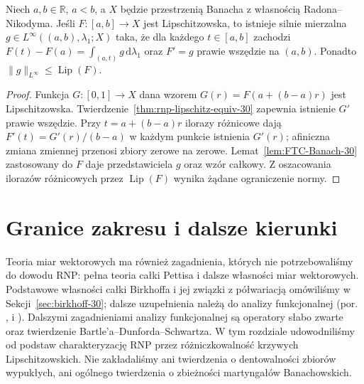 \begin{wniosek}\label{idx:30:wniosek:15}

Niech $a,b\in\mathbb R$, $a<b$, a $X$ będzie
przestrzenią Banacha z własnością Radona--Nikodyma.
Jeśli $F:[a,b]\to X$ jest Lipschitzowska, to istnieje
silnie mierzalna $g\in L^\infty((a,b),\lambda_1;X)$
taka, że dla każdego $t\in[a,b]$ zachodzi
$F(t)-F(a)=\int_{(a,t)}g\,\mathrm d\lambda_1$
oraz $F'=g$ prawie wszędzie na $(a,b)$.
Ponadto $\|g\|_{L^\infty}\le\operatorname{Lip}(F)$.
\end{wniosek}
\begin{proof}
Funkcja $G:[0,1]\to X$ dana wzorem
$G(r)=F(a+(b-a)r)$ jest Lipschitzowska.
Twierdzenie~\ref{thm:rnp-lipschitz-equiv-30} zapewnia
istnienie $G'$ prawie wszędzie. Przy $t=a+(b-a)r$
ilorazy różnicowe dają $F'(t)=G'(r)/(b-a)$
w każdym punkcie istnienia $G'(r)$; afiniczna
zmiana zmiennej przenosi zbiory zerowe na zerowe.
Lemat~\ref{lem:FTC-Banach-30} zastosowany do $F$
daje przedstawiciela $g$ oraz wzór całkowy.
Z oszacowania ilorazów różnicowych przez
$\operatorname{Lip}(F)$ wynika żądane ograniczenie normy.
\end{proof}

\section{Granice zakresu i dalsze kierunki}
Teoria miar wektorowych ma również zagadnienia,
których nie potrzebowaliśmy do dowodu RNP:
pełna teoria całki Pettisa i dalsze własności
miar wektorowych. Podstawowe własności całki Birkhoffa
i jej związki z półwariacją omówiliśmy w
Sekcji~\ref{sec:birkhoff-30}; dalsze uzupełnienia
należą do analizy funkcjonalnej
(por. ,
i ).
Dalszymi zagadnieniami analizy funkcjonalnej są operatory
słabo zwarte oraz twierdzenie Bartle'a--Dunforda--Schwartza.
W tym rozdziale udowodniliśmy od podstaw
charakteryzację RNP przez różniczkowalność krzywych
Lipschitzowskich. Nie zakładaliśmy ani twierdzenia
o dentowalności zbiorów wypukłych, ani ogólnego
twierdzenia o zbieżności martyngałów Banachowskich.
